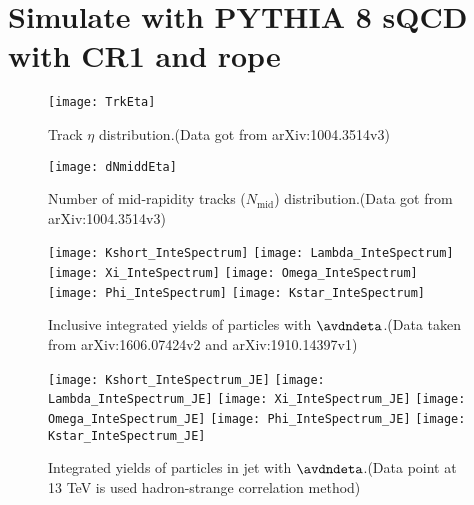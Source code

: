 
\section{Simulate with PYTHIA 8 sQCD with CR1 and rope}%
\label{sec:CRorRope}

\begin{figure}[t]
        \begin{center}
                \texttt{[image: TrkEta]}
        \end{center}
        \caption{Track $\eta$ distribution.(Data got from arXiv:1004.3514v3)}
        \label{fig:TrkEta}
\end{figure}

\begin{figure}[t]
	\begin{center}
		\texttt{[image: dNmiddEta]}
	\end{center}
	\caption{Number of mid-rapidity tracks ($N_\mathrm{mid}$) distribution.(Data got from arXiv:1004.3514v3)}
	\label{fig:TrkdNdEta}
\end{figure}

\begin{figure}[ht]
	\begin{center}
		\texttt{[image: Kshort\_InteSpectrum]}
		\texttt{[image: Lambda\_InteSpectrum]}
		\texttt{[image: Xi\_InteSpectrum]}
		\texttt{[image: Omega\_InteSpectrum]}
		\texttt{[image: Phi\_InteSpectrum]}
		\texttt{[image: Kstar\_InteSpectrum]}
	\end{center}
	\caption{Inclusive integrated yields of particles with $\avdndeta$.(Data taken from arXiv:1606.07424v2 and arXiv:1910.14397v1)}
	\label{fig:InclIntePar}
\end{figure}
\begin{figure}[ht]
	\begin{center}
		\texttt{[image: Kshort\_InteSpectrum\_JE]}
		\texttt{[image: Lambda\_InteSpectrum\_JE]}
		\texttt{[image: Xi\_InteSpectrum\_JE]}
		\texttt{[image: Omega\_InteSpectrum\_JE]}
		\texttt{[image: Phi\_InteSpectrum\_JE]}
		\texttt{[image: Kstar\_InteSpectrum\_JE]}
	\end{center}
	\caption{Integrated yields of particles in jet with $\avdndeta$.(Data point at 13 TeV is used hadron-strange correlation method)}
	\label{fig:JCIntePar}
\end{figure}

